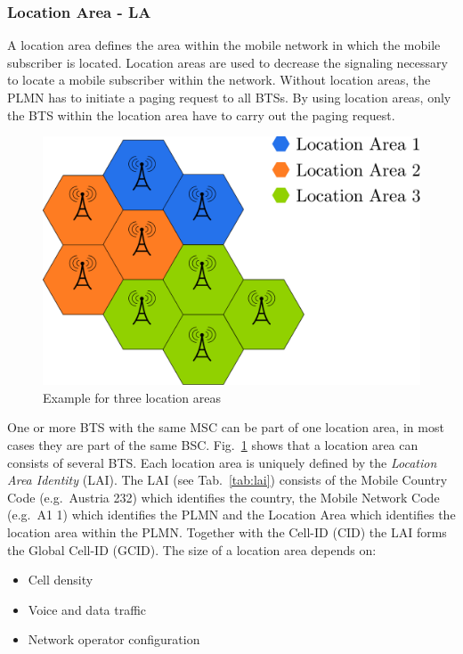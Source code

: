 \subsubsection{Location Area - LA}
A location area defines the area within the mobile network in which the mobile subscriber is located. Location areas are used to decrease the signaling necessary to locate a mobile subscriber within the network. Without location areas, the PLMN has to initiate a paging request to all BTSs. By using location areas, only the BTS within the location area have to carry out the paging request.

% 
\begin{figure}
	\centering
	\includegraphics[width=0.7\linewidth]{./images/locationarea}
	\caption{Example for three location areas} 
	\label{fig:locationarea}
\end{figure}

One or more BTS with the same MSC can be part of one location area, in most cases they are part of the same BSC. Fig.\ \ref{fig:locationarea} shows that a location area can consists of several BTS. Each location area is uniquely defined by the \emph{Location Area Identity} (LAI). The LAI (see Tab.\ \ref{tab:lai}) consists of the Mobile Country Code (e.g.\ Austria 232) which identifies the country, the Mobile Network Code (e.g.\ A1 1) which identifies the PLMN and the Location Area which identifies the location area within the PLMN. Together with the Cell-ID (CID) the LAI forms the Global Cell-ID (GCID). 
The size of a location area depends on:
\begin{itemize}
	\item Cell density
	\item Voice and data traffic
	\item Network operator configuration
\end{itemize}

